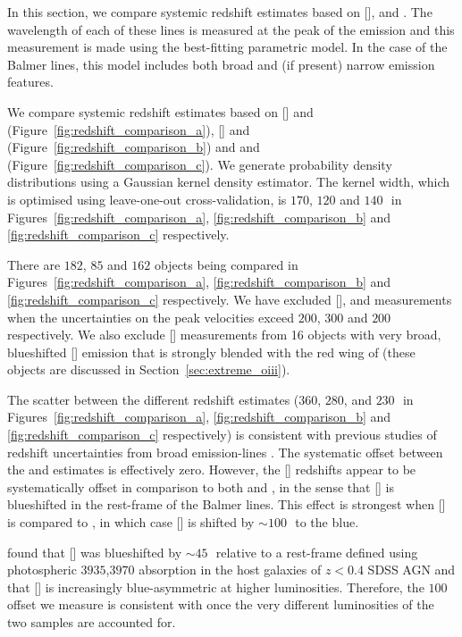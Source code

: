 In this section, we compare systemic redshift estimates based on [], \hb and \hans. 
The wavelength of each of these lines is measured at the peak of the emission and this measurement is made using the best-fitting parametric model. 
In the case of the Balmer lines, this model includes both broad and (if present) narrow emission features. 

We compare systemic redshift estimates based on [] and \hb (Figure~\ref{fig:redshift_comparison_a}), [] and \ha (Figure~\ref{fig:redshift_comparison_b}) and \hb and \ha (Figure~\ref{fig:redshift_comparison_c}). 
We generate probability density distributions using a Gaussian kernel density estimator.
The kernel width, which is optimised using leave-one-out cross-validation, is $170$, $120$ and $140$\,\kms\, in Figures~\ref{fig:redshift_comparison_a}, \ref{fig:redshift_comparison_b} and \ref{fig:redshift_comparison_c} respectively. 

There are $182$, $85$ and $162$ objects being compared in Figures~\ref{fig:redshift_comparison_a}, \ref{fig:redshift_comparison_b} and \ref{fig:redshift_comparison_c} respectively. 
We have excluded [], \hb and \ha measurements when the uncertainties on the peak velocities exceed $200$, $300$ and $200$\,\kms\, respectively. 
We also exclude [] measurements from 16 objects with very broad, blueshifted [] emission that is strongly blended with the red wing of \hb (these objects are discussed in Section~\ref{sec:extreme_oiii}).

The scatter between the different redshift estimates ($360$, $280$, and $230$\,\kms\, in Figures~\ref{fig:redshift_comparison_a}, \ref{fig:redshift_comparison_b} and \ref{fig:redshift_comparison_c} respectively) is consistent with previous studies of redshift uncertainties from broad emission-lines \citep[e.g.][]{shen16b}. 
The systematic offset between the \ha and \hb estimates is effectively zero. 
However, the [] redshifts appear to be systematically offset in comparison to both \ha and \hbns, in the sense that [] is blueshifted in the rest-frame of the Balmer lines. 
This effect is strongest when [] is compared to \hbns, in which case [] is shifted by $\sim100$\,\kms\, to the blue.

\citet{hewett10} found that [] was blueshifted by $\sim45$\,\kms\, relative to a rest-frame defined using photospheric \ll$3935$,$3970$ absorption in the host galaxies of $z<0.4$ SDSS AGN and that [] is increasingly blue-asymmetric at higher luminosities. 
Therefore, the $100$\,\kms offset we measure is consistent with \citet{hewett10} once the very different luminosities of the two samples are accounted for. 

